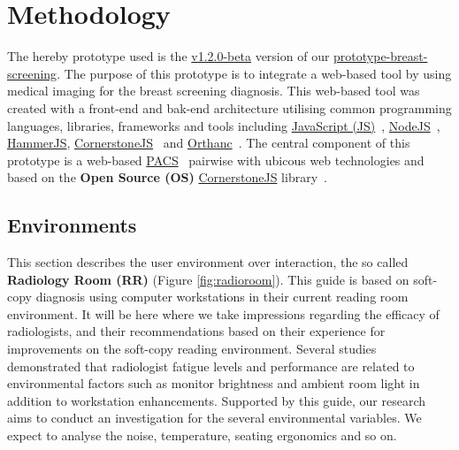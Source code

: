 
\section{Methodology}

The hereby prototype used is the \hyperlink{https://github.com/MIMBCD-UI/prototype-breast-screening/releases/tag/v1.2.0-beta}{v1.2.0-beta} version of our \hyperlink{https://github.com/MIMBCD-UI/prototype-breast-screening/}{prototype-breast-screening}. The purpose of this prototype is to integrate a web-based tool by using medical imaging for the breast screening diagnosis. This web-based tool was created with a front-end and bak-end architecture utilising common programming languages, libraries, frameworks and tools including \hyperlink{https://www.javascript.com/}{JavaScript (JS)}~\cite{flanagan2006javascript}, \hyperlink{https://nodejs.org/}{NodeJS}~\cite{wilson2018node}, \hyperlink{https://hammerjs.github.io/}{HammerJS}, \hyperlink{https://cornerstonejs.org/}{CornerstoneJS}~\cite{hostetter2018integration} and \hyperlink{https://www.orthanc-server.com/}{Orthanc}~\cite{Jodogne:ISBI2013}. The central component of this prototype is a web-based \hyperlink{https://www.sciencedirect.com/topics/medicine-and-dentistry/picture-archiving-and-communication-system}{PACS}~\cite{cooke2003picture} pairwise with ubicous web technologies and based on the \textbf{Open Source (OS)} \hyperlink{https://cornerstonejs.org/}{CornerstoneJS} library~\cite{feller2002understanding, hostetter2018integration}.


\subsection{Environments}

This section describes the user environment over interaction, the so called \textbf{Radiology Room (RR)} (Figure \ref{fig:radioroom}). This guide is based on soft-copy diagnosis using computer workstations in their current reading room environment. It will be here where we take impressions regarding the efficacy of radiologists, and their recommendations based on their experience for improvements on the soft-copy reading environment. Several studies demonstrated that radiologist fatigue levels and performance are related to environmental factors such as monitor brightness and ambient room light in addition to workstation enhancements. Supported by this guide, our research aims to conduct an investigation for the several environmental variables. We expect to analyse the noise, temperature, seating ergonomics and so on.

